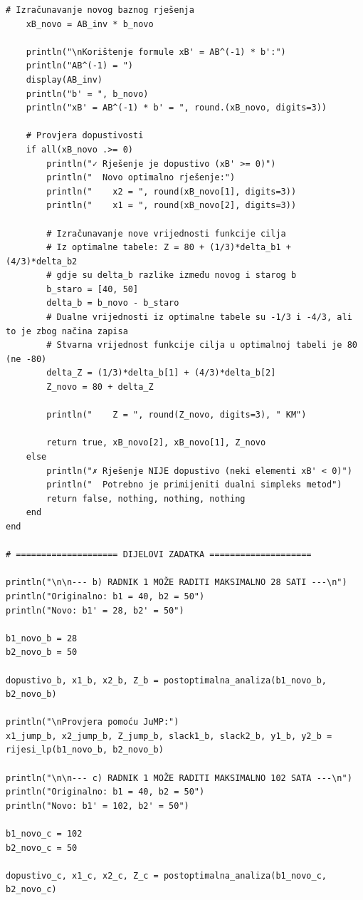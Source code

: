 \documentclass[12pt,a4paper]{article}
\begin{document}
\begin{lstlisting}[style=julia, caption={Julia kod za postoptimalnu analizu}]
    # Izračunavanje novog baznog rješenja
    xB_novo = AB_inv * b_novo
    
    println("\nKorištenje formule xB' = AB^(-1) * b':")
    println("AB^(-1) = ")
    display(AB_inv)
    println("b' = ", b_novo)
    println("xB' = AB^(-1) * b' = ", round.(xB_novo, digits=3))
    
    # Provjera dopustivosti
    if all(xB_novo .>= 0)
        println("✓ Rješenje je dopustivo (xB' >= 0)")
        println("  Novo optimalno rješenje:")
        println("    x2 = ", round(xB_novo[1], digits=3))
        println("    x1 = ", round(xB_novo[2], digits=3))
        
        # Izračunavanje nove vrijednosti funkcije cilja
        # Iz optimalne tabele: Z = 80 + (1/3)*delta_b1 + (4/3)*delta_b2
        # gdje su delta_b razlike između novog i starog b
        b_staro = [40, 50]
        delta_b = b_novo - b_staro
        # Dualne vrijednosti iz optimalne tabele su -1/3 i -4/3, ali to je zbog načina zapisa
        # Stvarna vrijednost funkcije cilja u optimalnoj tabeli je 80 (ne -80)
        delta_Z = (1/3)*delta_b[1] + (4/3)*delta_b[2]
        Z_novo = 80 + delta_Z
        
        println("    Z = ", round(Z_novo, digits=3), " KM")
        
        return true, xB_novo[2], xB_novo[1], Z_novo
    else
        println("✗ Rješenje NIJE dopustivo (neki elementi xB' < 0)")
        println("  Potrebno je primijeniti dualni simpleks metod")
        return false, nothing, nothing, nothing
    end
end

# ==================== DIJELOVI ZADATKA ====================

println("\n\n--- b) RADNIK 1 MOŽE RADITI MAKSIMALNO 28 SATI ---\n")
println("Originalno: b1 = 40, b2 = 50")
println("Novo: b1' = 28, b2' = 50")

b1_novo_b = 28
b2_novo_b = 50

dopustivo_b, x1_b, x2_b, Z_b = postoptimalna_analiza(b1_novo_b, b2_novo_b)

println("\nProvjera pomoću JuMP:")
x1_jump_b, x2_jump_b, Z_jump_b, slack1_b, slack2_b, y1_b, y2_b = rijesi_lp(b1_novo_b, b2_novo_b)

println("\n\n--- c) RADNIK 1 MOŽE RADITI MAKSIMALNO 102 SATA ---\n")
println("Originalno: b1 = 40, b2 = 50")
println("Novo: b1' = 102, b2' = 50")

b1_novo_c = 102
b2_novo_c = 50

dopustivo_c, x1_c, x2_c, Z_c = postoptimalna_analiza(b1_novo_c, b2_novo_c)


\end{lstlisting}
\end{document}
